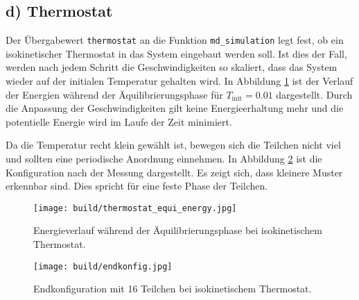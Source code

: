 \FloatBarrier
\subsection*{d) Thermostat}

Der Übergabewert \texttt{thermostat} an die Funktion \texttt{md\_simulation} legt fest,
ob ein isokinetischer Thermostat in das System eingebaut werden soll.
Ist dies der Fall, werden nach jedem Schritt die Geschwindigkeiten so skaliert, dass
das System wieder auf der initialen Temperatur gehalten wird.
In Abbildung \ref{fig:thermostat_equi_energy} ist der Verlauf der Energien während der
Äquilibrierungsphase für $T_\text{init} = 0.01$ dargestellt.
Durch die Anpassung der Geschwindigkeiten gilt keine Energieerhaltung mehr
und die potentielle Energie wird im Laufe der Zeit minimiert.

Da die Temperatur recht klein gewählt ist, bewegen sich die Teilchen nicht viel
und sollten eine periodische Anordnung einnehmen.
In Abbildung \ref{fig:endkonfig} ist die Konfiguration nach der Messung dargestellt.
Es zeigt sich, dass kleinere Muster erkennbar sind.
Dies spricht für eine feste Phase der Teilchen.
\begin{figure}
    \centering
    \texttt{[image: build/thermostat\_equi\_energy.jpg]}
    \caption{Energieverlauf während der Äquilibrierungsphase bei isokinetischem Thermostat.}
    \label{fig:thermostat_equi_energy}
\end{figure}
\begin{figure}
    \centering
    \texttt{[image: build/endkonfig.jpg]}
    \caption{Endkonfiguration mit 16 Teilchen bei isokinetischem Thermostat.}
    \label{fig:endkonfig}
\end{figure}
